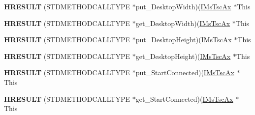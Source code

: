 \begin{DoxyCompactItemize}
\item 
\mbox{\label{struct_m_s_t_s_c_lib_1_1_i_ms_tsc_ax_vtbl_a28092feecf9d75fbb31c68c832dfebf9}} 
{\bfseries H\+R\+E\+S\+U\+LT} (S\+T\+D\+M\+E\+T\+H\+O\+D\+C\+A\+L\+L\+T\+Y\+PE $\ast$put\+\_\+\+Desktop\+Width)(\hyperlink{interface_m_s_t_s_c_lib_1_1_i_ms_tsc_ax}{I\+Ms\+Tsc\+Ax} $\ast$This
\item 
\mbox{\label{struct_m_s_t_s_c_lib_1_1_i_ms_tsc_ax_vtbl_aeb72adec6ee3755f8150e66cae519406}} 
{\bfseries H\+R\+E\+S\+U\+LT} (S\+T\+D\+M\+E\+T\+H\+O\+D\+C\+A\+L\+L\+T\+Y\+PE $\ast$get\+\_\+\+Desktop\+Width)(\hyperlink{interface_m_s_t_s_c_lib_1_1_i_ms_tsc_ax}{I\+Ms\+Tsc\+Ax} $\ast$This
\item 
\mbox{\label{struct_m_s_t_s_c_lib_1_1_i_ms_tsc_ax_vtbl_aa3cb3d4825a2654595b68dc32a7e81b4}} 
{\bfseries H\+R\+E\+S\+U\+LT} (S\+T\+D\+M\+E\+T\+H\+O\+D\+C\+A\+L\+L\+T\+Y\+PE $\ast$put\+\_\+\+Desktop\+Height)(\hyperlink{interface_m_s_t_s_c_lib_1_1_i_ms_tsc_ax}{I\+Ms\+Tsc\+Ax} $\ast$This
\item 
\mbox{\label{struct_m_s_t_s_c_lib_1_1_i_ms_tsc_ax_vtbl_a4d685ba656e0f262998b94610ce9b70f}} 
{\bfseries H\+R\+E\+S\+U\+LT} (S\+T\+D\+M\+E\+T\+H\+O\+D\+C\+A\+L\+L\+T\+Y\+PE $\ast$get\+\_\+\+Desktop\+Height)(\hyperlink{interface_m_s_t_s_c_lib_1_1_i_ms_tsc_ax}{I\+Ms\+Tsc\+Ax} $\ast$This
\item 
\mbox{\label{struct_m_s_t_s_c_lib_1_1_i_ms_tsc_ax_vtbl_a80f7bcce7d3cf84e196fd5720ecabd1b}} 
{\bfseries H\+R\+E\+S\+U\+LT} (S\+T\+D\+M\+E\+T\+H\+O\+D\+C\+A\+L\+L\+T\+Y\+PE $\ast$put\+\_\+\+Start\+Connected)(\hyperlink{interface_m_s_t_s_c_lib_1_1_i_ms_tsc_ax}{I\+Ms\+Tsc\+Ax} $\ast$This
\item 
\mbox{\label{struct_m_s_t_s_c_lib_1_1_i_ms_tsc_ax_vtbl_a4d42e832f6054557d7e6e051dac21934}} 
{\bfseries H\+R\+E\+S\+U\+LT} (S\+T\+D\+M\+E\+T\+H\+O\+D\+C\+A\+L\+L\+T\+Y\+PE $\ast$get\+\_\+\+Start\+Connected)(\hyperlink{interface_m_s_t_s_c_lib_1_1_i_ms_tsc_ax}{I\+Ms\+Tsc\+Ax} $\ast$This
\item 
\mbox{\label{struct_m_s_t_s_c_lib_1_1_i_ms_tsc_ax_vtbl_a5a10e963f03ac408fd5e3cab8d7526c9}} 

\end{DoxyCompactItemize}
